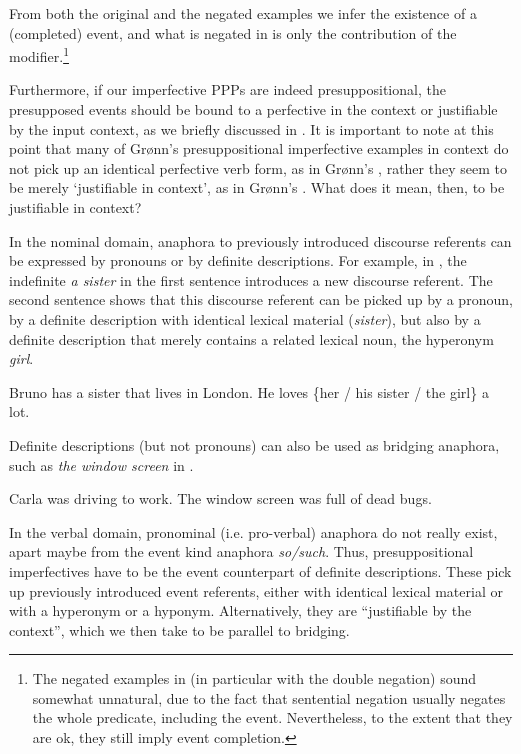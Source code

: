 \documentclass[output=paper,modfonts,newtxmath,hidelinks
]{langscibook}
\begin{document}
\noindent From both the original and the negated examples we infer the existence of a (completed) event, and what is negated in  is only the contribution of the modifier.\footnote{The negated examples in  (in particular  with the double negation) sound somewhat unnatural, due to the fact that sentential negation usually negates the whole predicate, including the event. Nevertheless, to the extent that they are ok, they still imply event completion.}

Furthermore, if our imperfective PPPs are indeed presuppositional, the presupposed events should be bound to a perfective in the context or justifiable by the input context, as we briefly discussed in . It is important to note at this point that many of Grønn's presuppositional imperfective examples in context do not pick up an identical perfective verb form, as in Grønn's , rather they seem to be merely `justifiable in context', as in Grønn's .  What does it mean, then, to be justifiable in context? 

In the nominal domain, anaphora to previously introduced discourse referents can be expressed by pronouns or by definite descriptions. For example, in , the indefinite \textit{a sister} in the first sentence introduces a new discourse referent. The second sentence shows that this discourse referent can be picked up by a pronoun, by a definite description with identical lexical material (\textit{sister}), but also by a definite description that merely contains a related lexical noun, the hyperonym \textit{girl}. 

\ea Bruno has a sister that lives in London. He loves \{her / his sister / the girl\} a lot.\label{Bruno}
\z

\noindent Definite descriptions (but not pronouns) can also be used as bridging anaphora, such as \textit{the window screen} in .

\ea
Carla was driving to work. The window screen was full of dead bugs.\label{Carla}
\z

\noindent In the verbal domain, pronominal (i.e. pro-verbal) anaphora do not really exist, apart maybe from the event kind anaphora \textit{so/such}. Thus, presuppositional imperfectives have to be the event counterpart of definite descriptions. These pick up previously introduced event referents, either with identical lexical material or with a hyperonym or a hyponym. Alternatively, they are ``justifiable by the context'', which we then take to be parallel to bridging.
\end{document}
